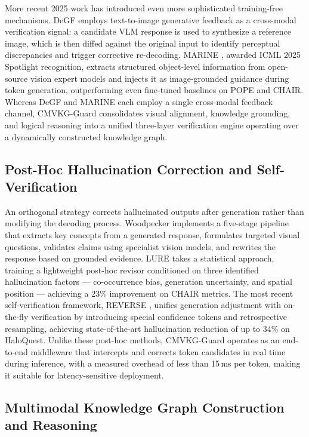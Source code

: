 More recent 2025 work has introduced even more sophisticated training-free mechanisms. DeGF \citep{zhang2025self} employs text-to-image generative feedback as a cross-modal verification signal: a candidate VLM response is used to synthesize a reference image, which is then diffed against the original input to identify perceptual discrepancies and trigger corrective re-decoding. MARINE \citep{zhao2025mitigating}, awarded ICML 2025 Spotlight recognition, extracts structured object-level information from open-source vision expert models and injects it as image-grounded guidance during token generation, outperforming even fine-tuned baselines on POPE and CHAIR. Whereas DeGF and MARINE each employ a single cross-modal feedback channel, CMVKG-Guard consolidates visual alignment, knowledge grounding, and logical reasoning into a unified three-layer verification engine operating over a dynamically constructed knowledge graph.

\subsection{Post-Hoc Hallucination Correction and Self-Verification}

An orthogonal strategy corrects hallucinated outputs after generation rather than modifying the decoding process. Woodpecker \citep{yin2024woodpecker} implements a five-stage pipeline that extracts key concepts from a generated response, formulates targeted visual questions, validates claims using specialist vision models, and rewrites the response based on grounded evidence. LURE \citep{zhou2024analyzing} takes a statistical approach, training a lightweight post-hoc revisor conditioned on three identified hallucination factors --- co-occurrence bias, generation uncertainty, and spatial position --- achieving a 23\% improvement on CHAIR metrics. The most recent self-verification framework, REVERSE \citep{wu2025generate}, unifies generation adjustment with on-the-fly verification by introducing special confidence tokens and retrospective resampling, achieving state-of-the-art hallucination reduction of up to 34\% on HaloQuest. Unlike these post-hoc methods, CMVKG-Guard operates as an end-to-end middleware that intercepts and corrects token candidates in real time during inference, with a measured overhead of less than 15\,ms per token, making it suitable for latency-sensitive deployment.

\subsection{Multimodal Knowledge Graph Construction and Reasoning}

